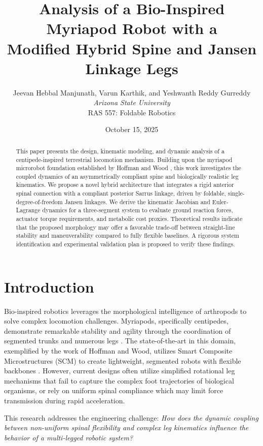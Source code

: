 \documentclass[11pt, letterpaper]{article}
\title{\textbf{Analysis of a Bio-Inspired Myriapod Robot with a\\Modified Hybrid Spine and Jansen Linkage Legs}}
\author{
    Jeevan Hebbal Manjunath, Varun Karthik, and Yeshwanth Reddy Gurreddy\\
    \textit{Arizona State University}\\
    RAS 557: Foldable Robotics
}
\date{October 15, 2025}
\begin{document}
\maketitle

\begin{abstract}
This paper presents the design, kinematic modeling, and dynamic analysis of a centipede-inspired terrestrial locomotion mechanism. Building upon the myriapod microrobot foundation established by Hoffman and Wood \cite{hoffman2011myriapod}, this work investigates the coupled dynamics of an asymmetrically compliant spine and biologically realistic leg kinematics. We propose a novel hybrid architecture that integrates a rigid anterior spinal connection with a compliant posterior Sarrus linkage, driven by foldable, single-degree-of-freedom Jansen linkages. We derive the kinematic Jacobian and Euler-Lagrange dynamics for a three-segment system to evaluate ground reaction forces, actuator torque requirements, and metabolic cost proxies. Theoretical results indicate that the proposed morphology may offer a favorable trade-off between straight-line stability and maneuverability compared to fully flexible baselines. A rigorous system identification and experimental validation plan is proposed to verify these findings.
\end{abstract}

\section{Introduction}

Bio-inspired robotics leverages the morphological intelligence of arthropods to solve complex locomotion challenges. Myriapods, specifically centipedes, demonstrate remarkable stability and agility through the coordination of segmented trunks and numerous legs \cite{hoffman2011myriapod}. The state-of-the-art in this domain, exemplified by the work of Hoffman and Wood, utilizes Smart Composite Microstructures (SCM) to create lightweight, segmented robots with flexible backbones \cite{hoffman2011myriapod}. However, current designs often utilize simplified rotational leg mechanisms that fail to capture the complex foot trajectories of biological organisms, or rely on uniform spinal compliance which may limit force transmission during rapid acceleration.

This research addresses the engineering challenge: \emph{How does the dynamic coupling between non-uniform spinal flexibility and complex leg kinematics influence the behavior of a multi-legged robotic system?}
\end{document}
